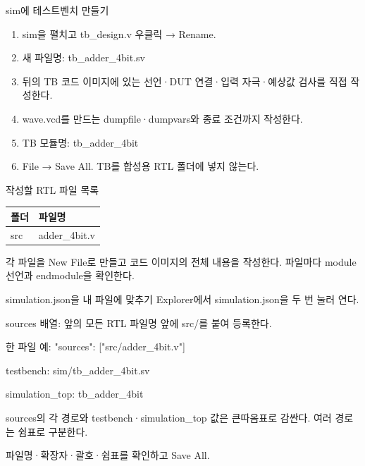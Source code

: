 \begin{frame}{sim에 테스트벤치 만들기}\relax
\small
\begin{enumerate}\setlength{\itemsep}{0.22cm}
\item sim을 펼치고 tb\_design.v 우클릭 → Rename.
\item 새 파일명: tb\_adder\_4bit.sv
\item 뒤의 TB 코드 이미지에 있는 선언·DUT 연결·입력 자극·예상값 검사를 직접 작성한다.
\item wave.vcd를 만드는 dumpfile·dumpvars와 종료 조건까지 작성한다.
\item TB 모듈명: tb\_adder\_4bit
\item File → Save All. TB를 합성용 RTL 폴더에 넣지 않는다.
\end{enumerate}

\end{frame}

\begin{frame}{작성할 RTL 파일 목록}\relax
\small
\begin{center}\renewcommand{\arraystretch}{1.45}
\begin{tabular}{l|l}
폴더 & 파일명\\\hline
src & adder\_4bit.v\\
\end{tabular}\end{center}
각 파일을 New File로 만들고 코드 이미지의 전체 내용을 작성한다. 파일마다 module 선언과 endmodule을 확인한다.\par
\end{frame}

\begin{frame}{simulation.json을 내 파일에 맞추기}\relax
\small
Explorer에서 simulation.json을 두 번 눌러 연다.\par\vspace{0.22cm}sources 배열: 앞의 모든 RTL 파일명 앞에 src/를 붙여 등록한다.\par\vspace{0.22cm}한 파일 예: "sources": ["src/adder\_4bit.v"]\par\vspace{0.22cm}testbench: sim/tb\_adder\_4bit.sv\par\vspace{0.22cm}simulation\_top: tb\_adder\_4bit\par\vspace{0.22cm}sources의 각 경로와 testbench·simulation\_top 값은 큰따옴표로 감싼다. 여러 경로는 쉼표로 구분한다.\par\vspace{0.22cm}파일명·확장자·괄호·쉼표를 확인하고 Save All.\par
\end{frame}

